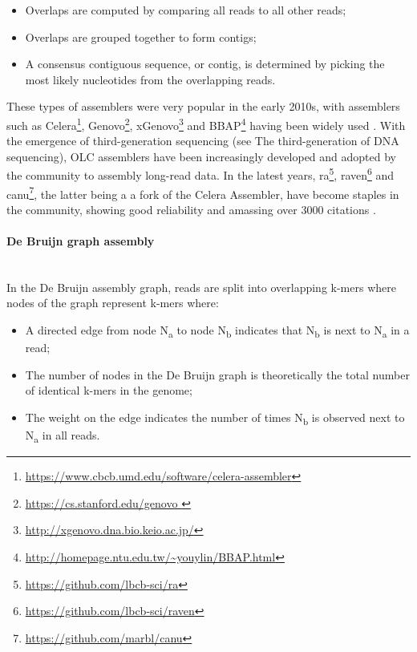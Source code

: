 \begin{itemize}
    \item Overlaps are computed by comparing all reads to all other reads;
    \item Overlaps are grouped together to form contigs;
    \item A consensus contiguous sequence, or contig, is determined by picking the most likely nucleotides from the overlapping reads.
\end{itemize}

These types of assemblers were very popular in the early 2010s, with assemblers such as Celera\footnote{\url{https://www.cbcb.umd.edu/software/celera-assembler}},  Genovo\footnote{\url{https://cs.stanford.edu/genovo }}, xGenovo\footnote{\url{http://xgenovo.dna.bio.keio.ac.jp/}} and BBAP\footnote{\url{http://homepage.ntu.edu.tw/~youylin/BBAP.html}} having been widely used \citep{myers_whole-genome_2000, hutchison_genovo_2010, afiahayati_extended_2013, lin_novo_2017}.
With the emergence of third-generation sequencing (see  The third-generation of DNA sequencing), \ac{OLC} assemblers have been increasingly developed and adopted by the community to assembly long-read data. 
In the latest years, ra\footnote{\url{https://github.com/lbcb-sci/ra}}, raven\footnote{\url{https://github.com/lbcb-sci/raven}} and canu\footnote{\url{https://github.com/marbl/canu}}, the latter being a a fork of the Celera Assembler, have become staples in the community, showing good reliability and amassing over 3000 citations \citep{vaser_yet_2019, koren_canu_2017, wick_benchmarking_2021}.

\paragraph{De Bruijn graph assembly} \label{sssec:_intro_dbg_assembly} \mbox{}\\

In the De Bruijn assembly graph, reads are split into overlapping k-mers where nodes of the graph represent k-mers where:

\begin{itemize}
    \item A directed edge from node N\textsubscript{a} to node N\textsubscript{b} indicates that N\textsubscript{b} is next to N\textsubscript{a} in a read;
    \item The number of nodes in the De Bruijn graph is theoretically the total number of identical k-mers in the genome;
    \item The weight on the edge indicates the number of times N\textsubscript{b} is observed next to N\textsubscript{a} in all reads.
\end{itemize}

